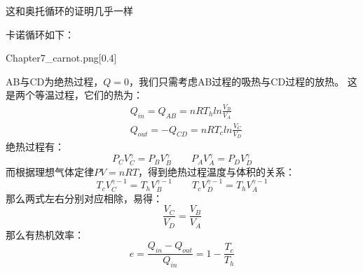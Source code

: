         \begin{prove}
            这和奥托循环的证明几乎一样

            卡诺循环如下：
            \begin{singlefigure}{Chapter7_carnot.png}[0.4]
            \end{singlefigure}
            AB与CD为绝热过程，$Q = 0$，我们只需考虑AB过程的吸热与CD过程的放热。
            这是两个等温过程，它们的热为：
            \begin{equation}
                \begin{aligned}
                    &Q_{in} = Q_{AB} = nRT_{h}ln\frac{V_B}{V_A}\\
                    &Q_{out} = -Q_{CD} = nRT_{c}ln\frac{V_C}{V_D}
                \end{aligned}
                \nonumber
            \end{equation}
            绝热过程有：
            \begin{equation}
                P_{C}V_{C}^{\gamma} = P_{B}V_{B}^{\gamma} \qquad   P_{A}V_{A}^{\gamma} = P_{D}V_{D}^{\gamma}
                \nonumber
            \end{equation}
            而根据理想气体定律$PV=nRT$，得到绝热过程温度与体积的关系：
            \begin{equation}
                T_{c}V_{C}^{\gamma-1} = T_{h}V_{B}^{\gamma-1} \qquad T_{c}V_{D}^{\gamma-1} = T_{h}V_{A}^{\gamma-1}
                \nonumber
            \end{equation}
            那么两式左右分别对应相除，易得：
            \begin{equation}
                \frac{V_C}{V_D} = \frac{V_B}{V_A}
                \nonumber
            \end{equation}
            那么有热机效率：
            \begin{equation}
                e = \frac{Q_{in}-Q_{out}}{Q_{in}} = 1 - \frac{T_{c}}{T_{h}}
            \end{equation}
        \end{prove}
